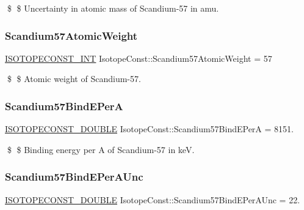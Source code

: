 \$ \$ Uncertainty in atomic mass of Scandium-\/57 in amu. \mbox{\label{group___isotope_const-_scandium-_sc57_ga45893fbe6b3e331b1f31230e507ab41a}} 
\subsubsection{\texorpdfstring{Scandium57\+Atomic\+Weight}{Scandium57AtomicWeight}}
{\footnotesize\ttfamily \mbox{\hyperlink{group___isotope_const-_macros_ga5f18360b3e99483a35c32d789e62621c}{I\+S\+O\+T\+O\+P\+E\+C\+O\+N\+S\+T\+\_\+\+I\+NT}} Isotope\+Const\+::\+Scandium57\+Atomic\+Weight = 57}

\$ \$ Atomic weight of Scandium-\/57. \mbox{\label{group___isotope_const-_scandium-_sc57_ga648365f3ce3bf0cf76eacc09f125d6b7}} 
\subsubsection{\texorpdfstring{Scandium57\+Bind\+E\+PerA}{Scandium57BindEPerA}}
{\footnotesize\ttfamily \mbox{\hyperlink{group___isotope_const-_macros_ga8f45a7272ce02c0b4c65c44636ed719a}{I\+S\+O\+T\+O\+P\+E\+C\+O\+N\+S\+T\+\_\+\+D\+O\+U\+B\+LE}} Isotope\+Const\+::\+Scandium57\+Bind\+E\+PerA = 8151.}

\$ \$ Binding energy per A of Scandium-\/57 in keV. \mbox{\label{group___isotope_const-_scandium-_sc57_gaef4583993517e26aadefda91cdd04905}} 
\subsubsection{\texorpdfstring{Scandium57\+Bind\+E\+Per\+A\+Unc}{Scandium57BindEPerAUnc}}
{\footnotesize\ttfamily \mbox{\hyperlink{group___isotope_const-_macros_ga8f45a7272ce02c0b4c65c44636ed719a}{I\+S\+O\+T\+O\+P\+E\+C\+O\+N\+S\+T\+\_\+\+D\+O\+U\+B\+LE}} Isotope\+Const\+::\+Scandium57\+Bind\+E\+Per\+A\+Unc = 22.}

